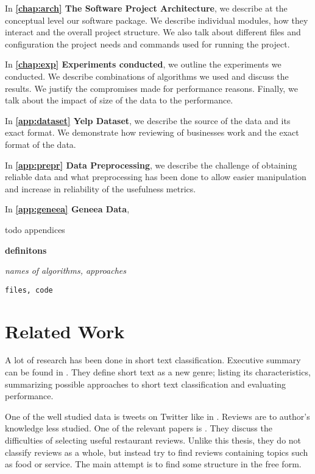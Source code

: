 In \textbf{\autoref{chap:arch} The Software Project Architecture}, we describe at the conceptual level our software package.
We describe individual modules, how they interact and the overall project structure.
We also talk about different files and configuration the project needs and commands used for running the project.

In \textbf{\autoref{chap:exp} Experiments conducted}, we outline the experiments we conducted.
We describe combinations of algorithms we used and discuss the results.
We justify the compromises made for performance reasons.
Finally, we talk about the impact of size of the data to the performance.

In \textbf{\autoref{app:dataset} Yelp Dataset},
we describe the source of the data and its exact format.
We demonstrate how reviewing of businesses work and
the exact format of the data.

In \textbf{\autoref{app:prepr} Data Preprocessing},
we describe the challenge of obtaining reliable data and
what preprocessing has been done to allow easier manipulation and increase in reliability of the usefulness metrics.

In \textbf{\autoref{app:geneea} Geneea Data},

todo appendices




{\bf definitons}

{\it names of algorithms, approaches}

\texttt{files, code}



\section{Related Work}

A lot of research has been done in short text classification.
Executive summary can be found in \citet{Song14}.
They define short text as a new genre; listing its characteristics, summarizing possible approaches to short text classification and evaluating performance.

One of the well studied data is tweets on Twitter like in \citep{sriram2010short}.
Reviews are to author's knowledge less studied.
One of the relevant papers is \citet{ganu2009beyond}.
They discuss the difficulties of selecting useful restaurant reviews.
Unlike this thesis, they do not classify reviews as a whole, but instead try to find reviews containing topics such as food or service.
The main attempt is to find some structure in the free form.

